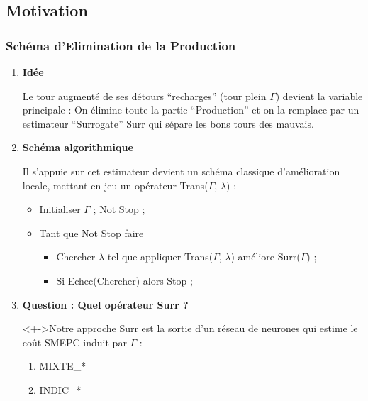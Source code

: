 \documentclass[hyperref={bookmarks=false},aspectratio=169]{beamer}
\begin{document}
\subsection{Motivation}
\begin{frame}
\frametitle{Schéma d’Elimination de la Production}

\begin{enumerate}
\item<+-> \textbf{Idée} 

Le tour augmenté de ses détours \enquote{recharges} (tour plein $\Gamma$) devient la variable
principale : On élimine toute la partie \enquote{Production} et on la remplace par un estimateur
\enquote{Surrogate} Surr qui sépare les bons tours des mauvais.

\item<+-> \textbf{Schéma algorithmique} 

Il s’appuie sur cet estimateur devient un schéma classique
d’amélioration locale, mettant en jeu un opérateur Trans($\Gamma$, $\lambda$) :
\begin{itemize}
\item Initialiser $\Gamma$ ; Not Stop ;
\item Tant que Not Stop faire
\begin{itemize}
\item Chercher $\lambda$ tel que appliquer Trans($\Gamma$, $\lambda$) améliore Surr($\Gamma$) ;
\item Si Echec(Chercher) alors Stop ;
\end{itemize}
\end{itemize}
\item<+-> \textbf{Question : Quel opérateur Surr ? }

\begin{alertblock}<+->{Notre approche}
Surr est la sortie d’un réseau de neurones qui estime le coût SMEPC induit par $\Gamma$ :
\begin{enumerate}
\item MIXTE\_*
\item INDIC\_*
\end{enumerate}
 \end{alertblock}


\end{enumerate}
\end{frame}
\end{document}
